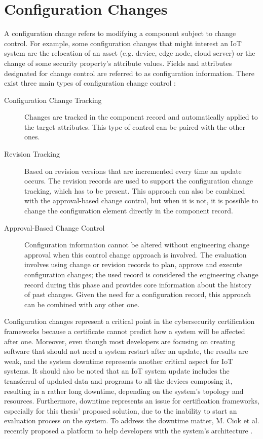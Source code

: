 





\section{Configuration Changes}
A configuration change refers to modifying a component subject to change control. For example, some configuration changes that might interest an IoT system are the relocation of an asset (e.g. device, edge node, cloud server) or the change of some security property's attribute values.
Fields and attributes designated for change control are referred to as configuration information. There exist three main types of configuration change control \cite{IBMConfChange}:
\begin{description}
    \item[Configuration Change Tracking] Changes are tracked in the component record and automatically applied to the target attributes. This type of control can be paired with the other ones.
    \item[Revision Tracking] Based on revision versions that are incremented every time an update occurs. The revision records are used to support the configuration change tracking, which has to be present. This approach can also be combined with the approval-based change control, but when it is not, it is possible to change the configuration element directly in the component record.
    \item[Approval-Based Change Control] Configuration information cannot be altered without engineering change approval when this control change approach is involved. The evaluation involves using change or revision records to plan, approve and execute configuration changes; the used record is considered the engineering change record during this phase and provides core information about the history of past changes. Given the need for a configuration record, this approach can be combined with any other one.
\end{description}

Configuration changes represent a critical point in the cybersecurity certification frameworks because a certificate cannot predict how a system will be affected after one. Moreover, even though most developers are focusing on creating software that should not need a system restart after an update, the results are weak, and the system downtime represents another critical aspect for IoT systems. It should also be noted that an IoT system update includes the transferral of updated data and programs to all the devices composing it, resulting in a rather long downtime, depending on the system's topology and resources. Furthermore, downtime represents an issue for certification frameworks, especially for this thesis' proposed solution, due to the inability to start an evaluation process on the system.
To address the downtime matter, M. Ciok et al. recently proposed a platform to help developers with the system's architecture \cite{mateusz2022flex}.

